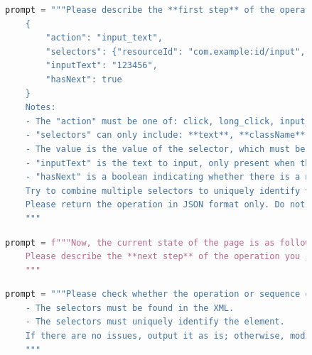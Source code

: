 \documentclass[twocolumn, 10pt]{article}
\begin{document}
\begin{figure}[t]
\centering
\begin{lstlisting}[language=python, caption=初始事件生成]
    prompt = """Please describe the **first step** of the operation you just performed in JSON format, as shown below:
    {
        "action": "input_text",
        "selectors": {"resourceId": "com.example:id/input", "text": "password"},
        "inputText": "123456",
        "hasNext": true
    }
    Notes:
    - The "action" must be one of: click, long_click, input_text, press_enter
    - "selectors" can only include: **text**, **className**, **description**, **resourceId**, and must be in camelCase. You can not use other selectors.
    - The value is the value of the selector, which must be found in the previous XML
    - "inputText" is the text to input, only present when the action is input_text
    - "hasNext" is a boolean indicating whether there is a next step. Set it to false if there is no next step
    Try to combine multiple selectors to uniquely identify the element.
    Please return the operation in JSON format only. Do not explain or use code blocks.
    """
\end{lstlisting}
\label{fig:iterative}
\end{figure}

\begin{figure}[t!]
\centering
\begin{lstlisting}[language=python, caption=后续事件生成]
    prompt = f"""Now, the current state of the page is as follows: {get_xml(self.device.u2)}
    Please describe the **next step** of the operation you just performed in JSON format, using the same format as above.
    """
\end{lstlisting}
\label{fig:next}
\end{figure}

\begin{figure}[t!]
\centering
\begin{lstlisting}[language=python, caption=操作检查]
    prompt = """Please check whether the operation or sequence of operations you just generated meets the requirements:
    - The selectors must be found in the XML.
    - The selectors must uniquely identify the element.
    If there are no issues, output it as is; otherwise, modify it accordingly.
    """
\end{lstlisting}
\label{fig:check}
\end{figure}



\end{document}
